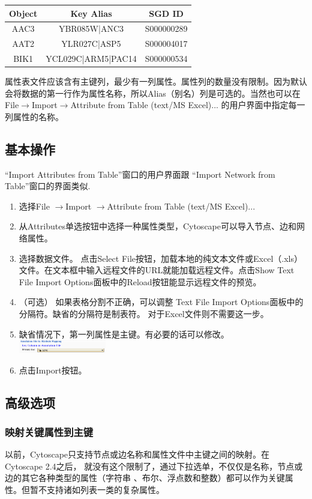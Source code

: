 \begin{tabular}{|c|c|c|}
\hline 
 Object& Key Alias& SGD ID\\
\hline
 AAC3 &YBR085W|ANC3& S000000289\\
 AAT2 &YLR027C|ASP5& S000004017\\
 BIK1 &YCL029C|ARM5|PAC14 &S000000534\\
 \hline 
\end{tabular}

属性表文件应该含有主键列，最少有一列属性。属性列的数量没有限制。因为默认会将数据的第一行作为属性名称，所以Alias（别名）列是可选的。当然也可以在
File$\rightarrow$Import$\rightarrow$Attribute from Table (text/MS Excel)...
的用户界面中指定每一列属性的名称。

\subsection{基本操作}
``Import Attributes from Table''窗口的用户界面跟
``Import Network from Table''窗口的界面类似. 
\begin{enumerate}
\item 选择File $\rightarrow$Import $\rightarrow$Attribute from Table (text/MS
Excel)... 
\item 从Attributes单选按钮中选择一种属性类型，Cytoscape可以导入节点、边和网络属性。
\item 选择数据文件。 点击Select File按钮，加载本地的纯文本文件或Excel（.xls）文件。在文本框中输入远程文件的URL就能加载远程文件。点击Show Text File Import Options面板中的Reload按钮能显示远程文件的预览。
\item （可选） 如果表格分割不正确，可以调整
Text File Import Options面板中的分隔符。缺省的分隔符是制表符。
对于Excel文件则不需要这一步。
\item 缺省情况下，第一列属性是主键。有必要的话可以修改。\\
\includegraphics[width=0.3\textwidth]{images/attribute_table_import_primary_key.png} 
\item 点击Import按钮。 
\end{enumerate}
 
\subsection{高级选项}
\subsubsection{映射关键属性到主键}
以前，Cytoscape只支持节点或边名称和属性文件中主键之间的映射。在Cytoscape 2.4之后，
就没有这个限制了，通过下拉选单，不仅仅是名称，节点或边的其它各种类型的属性（字符串
、布尔、浮点数和整数）都可以作为关键属性。但暂不支持诸如列表一类的复杂属性。

